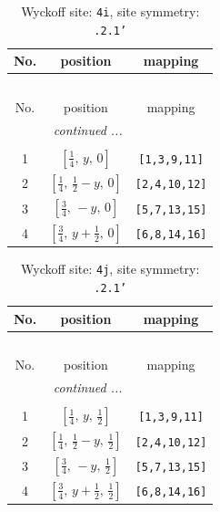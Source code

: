 \documentclass[fleqn,8pt]{jsarticle}
\begin{document}
\renewcommand{\arraystretch}{1.2}
\begin{longtable}{ccc}
\caption{Wyckoff site: {\tt 4i}, site symmetry: {\tt .2.1'}}
 \\
 \hline \hline
No. & position & mapping \\ \hline \endfirsthead

\multicolumn{2}{l}{\tablename\ \thetable{}} \\
 \hline \hline
No. & position & mapping \\ \hline \endhead

 \hline \hline
\multicolumn{2}{r}{\footnotesize\it continued ...} \\ \endfoot

 \hline \hline
\multicolumn{2}{r}{} \\ \endlastfoot

1 & $\left[ \frac{1}{4},\, y,\, 0 \right]$ & {\tt [1,3,9,11]} \\ \hline
2 & $\left[ \frac{1}{4},\, \frac{1}{2} - y,\, 0 \right]$ & {\tt [2,4,10,12]} \\ \hline
3 & $\left[ \frac{3}{4},\, - y,\, 0 \right]$ & {\tt [5,7,13,15]} \\ \hline
4 & $\left[ \frac{3}{4},\, y + \frac{1}{2},\, 0 \right]$ & {\tt [6,8,14,16]} \\
\end{longtable}
\renewcommand{\arraystretch}{1.2}
\begin{longtable}{ccc}
\caption{Wyckoff site: {\tt 4j}, site symmetry: {\tt .2.1'}}
 \\
 \hline \hline
No. & position & mapping \\ \hline \endfirsthead

\multicolumn{2}{l}{\tablename\ \thetable{}} \\
 \hline \hline
No. & position & mapping \\ \hline \endhead

 \hline \hline
\multicolumn{2}{r}{\footnotesize\it continued ...} \\ \endfoot

 \hline \hline
\multicolumn{2}{r}{} \\ \endlastfoot

1 & $\left[ \frac{1}{4},\, y,\, \frac{1}{2} \right]$ & {\tt [1,3,9,11]} \\ \hline
2 & $\left[ \frac{1}{4},\, \frac{1}{2} - y,\, \frac{1}{2} \right]$ & {\tt [2,4,10,12]} \\ \hline
3 & $\left[ \frac{3}{4},\, - y,\, \frac{1}{2} \right]$ & {\tt [5,7,13,15]} \\ \hline
4 & $\left[ \frac{3}{4},\, y + \frac{1}{2},\, \frac{1}{2} \right]$ & {\tt [6,8,14,16]} \\
\end{longtable}
\end{document}
